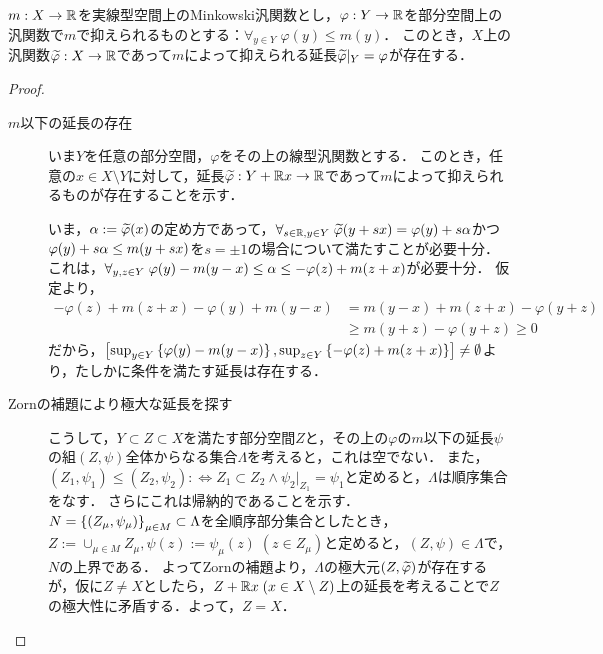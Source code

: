 \documentclass[uplatex,dvipdfmx]{jsreport}
\begin{document}
\begin{lemma}
    $m:X\to\mathbb{R}$を実線型空間上のMinkowski汎関数とし，$\varphi:Y\to\mathbb{R}$を部分空間上の汎関数で$m$で抑えられるものとする：$\forall_{y\in Y}\;\varphi(y)\le m(y)$．
    このとき，$X$上の汎関数$\widetilde{\varphi}:X\to\mathbb{R}$であって$m$によって抑えられる延長$\widetilde{\varphi}|_Y=\varphi$が存在する．
\end{lemma}
\begin{proof}\mbox{}
    \begin{description}
        \item[$m$以下の延長の存在] いま$Y$を任意の部分空間，$\varphi$をその上の線型汎関数とする．
        このとき，任意の$x\in X\setminus Y$に対して，延長$\widetilde{\varphi}:Y+\mathbb{R} x\to\mathbb{R}$であって$m$によって抑えられるものが存在することを示す．

        いま，$\alpha:=\widetilde{\varphi}(x)$の定め方であって，$\forall_{s\in\mathbb{R},y\in Y}\;\widetilde{\varphi}(y+sx)=\varphi(y)+s\alpha$かつ$\varphi(y)+s\alpha\le m(y+sx)$を$s=\pm 1$の場合について満たすことが必要十分．
        これは，$\forall_{y,z\in Y}\;\varphi(y)-m(y-x)\le\alpha\le-\varphi(z)+m(z+x)$が必要十分．
        仮定より，
        \begin{align*}
            -\varphi(z)+m(z+x)-\varphi(y)+m(y-x)&=m(y-x)+m(z+x)-\varphi(y+z)\\
            &\ge m(y+z)-\varphi(y+z)\ge 0
        \end{align*}
        だから，$\left[\sup_{y\in Y}\left\{\varphi(y)-m(y-x)\right\},\sup_{z\in Y}\left\{-\varphi(z)+m(z+x)\right\}\right]\ne\emptyset$より，たしかに条件を満たす延長は存在する．
        \item[Zornの補題により極大な延長を探す]
        こうして，$Y\subset Z\subset X$を満たす部分空間$Z$と，その上の$\varphi$の$m$以下の延長$\psi$の組$(Z,\psi)$全体からなる集合$\Lambda$を考えると，これは空でない．
        また，$(Z_1,\psi_1)\le(Z_2,\psi_2):\Leftrightarrow Z_1\subset Z_2\land\psi_2|_{Z_1}=\psi_1$と定めると，$\Lambda$は順序集合をなす．
        さらにこれは帰納的であることを示す．
        $N=\left\{(Z_\mu,\psi_\mu)\right\}_{\mu\in M}\subset\Lambda$を全順序部分集合としたとき，$Z:=\cup_{\mu\in M}Z_\mu,\psi(z):=\psi_\mu(z)\;(z\in Z_\mu)$と定めると，$(Z,\psi)\in\Lambda$で，$N$の上界である．
        よってZornの補題より，$\Lambda$の極大元$(Z,\widetilde{\varphi})$が存在するが，仮に$Z\ne X$としたら，$Z+\mathbb{R} x\;(x\in X\setminus Z)$上の延長を考えることで$Z$の極大性に矛盾する．よって，$Z=X$．
    \end{description}
\end{proof}
\end{document}
